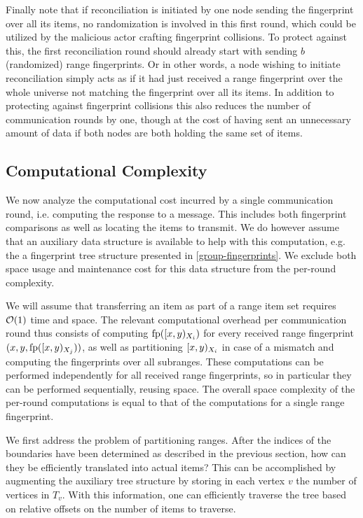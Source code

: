 Finally note that if reconciliation is initiated by one node sending the fingerprint over all its items, no randomization is involved in this first round, which could be utilized by the malicious actor crafting fingerprint collisions. To protect against this, the first reconciliation round should already start with sending $b$ (randomized) range fingerprints. Or in other words, a node wishing to initiate reconciliation simply acts as if it had just received a range fingerprint over the whole universe not matching the fingerprint over all its items. In addition to protecting against fingerprint collisions this also reduces the number of communication rounds by one, though at the cost of having sent an unnecessary amount of data if both nodes are both holding the same set of items.

\subsection{Computational Complexity}

We now analyze the computational cost incurred by a single communication round, i.e. computing the response to a message. This includes both fingerprint comparisons as well as locating the items to transmit. We do however assume that an auxiliary data structure is available to help with this computation, e.g. the a fingerprint tree structure presented in \cref{group-fingerprints}. We exclude both space usage and maintenance cost for this data structure from the per-round complexity.

We will assume that transferring an item as part of a range item set requires $\mathcal{O}(1)$ time and space. The relevant computational overhead per communication round thus consists of computing $\operatorname{fp}([{x},{y})_{X_i})$ for every received range fingerprint $({x}, {y}, {\operatorname{fp}([{x},{y})_{X_j})})$, as well as partitioning $[{x},{y})_{X_i}$ in case of a mismatch and computing the fingerprints over all subranges. These computations can be performed independently for all received range fingerprints, so in particular they can be performed sequentially, reusing space. The overall space complexity of the per-round computations is equal to that of the computations for a single range fingerprint.

We first address the problem of partitioning ranges. After the indices of the boundaries have been determined as described in the previous section, how can they be efficiently translated into actual items? This can be accomplished by augmenting the auxiliary tree structure by storing in each vertex $v$ the number of vertices in $T_v$. With this information, one can efficiently traverse the tree based on relative offsets on the number of items to traverse.

